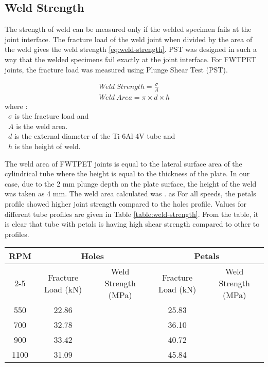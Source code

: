 \documentclass[3p]{elsarticle}
\begin{document}
\subsection{Weld Strength}
\label{subsec:Weld Strength}
The strength of weld can be measured only if the welded specimen fails at the joint interface. The fracture load of the weld joint when divided by the area of the weld gives the weld strength \ref{eq:weld-strength}. PST was designed in such a way that the welded specimens fail exactly at the joint interface. For FWTPET joints, the fracture load was measured using Plunge Shear Test (PST). 

\begin{gather} 
Weld\:Strength = \frac{\sigma}{A} \label{eq:weld-strength} \\
Weld\:Area = \pi \times d \times h \label{eq:weld-area}
\end{gather}
where :\\
~$\sigma$ is the fracture load and \\
~$A$ is the weld area. \\
~$d$ is the external diameter of the Ti-6Al-4V tube and \\
~$h$ is the height of weld.

The weld area of FWTPET joints is equal to the lateral surface area of the cylindrical tube where the height is equal to the thickness of the plate. In our case, due to the 2 mm plunge depth on the plate surface, the height of the weld was taken as 4 mm. The weld area calculated was . as For all speeds, the petals profile showed higher joint strength compared to the holes profile. Values for different tube profiles are given in Table \ref{table:weld-strength}. From the table, it is clear that tube with petals is having high shear strength compared to other to profiles.


\begin{table*}[htpb]
\centering
\caption{Fracture load and Weld Strength of FWTPET Samples}
\label{table:weld-strength}
\begin{tabular}{|c|c|c|c|c|}
\hline
\multirow{2}{*}{RPM} & \multicolumn{2}{c|}{Holes}               & \multicolumn{2}{c|}{Petals}              \\ \cline{2-5} 
                     & Fracture Load (kN) & Weld Strength (MPa) & Fracture Load (kN) & Weld Strength (MPa) \\ \hline
550                  & 22.86              &                     & 25.83              &                     \\ \hline
700                  & 32.78              &                     & 36.10              &                     \\ \hline
900                  & 33.42              &                     & 40.72              &                     \\ \hline
1100                 & 31.09              &                     & 45.84              &                     \\ \hline
\end{tabular}
\end{table*}
\end{document}
